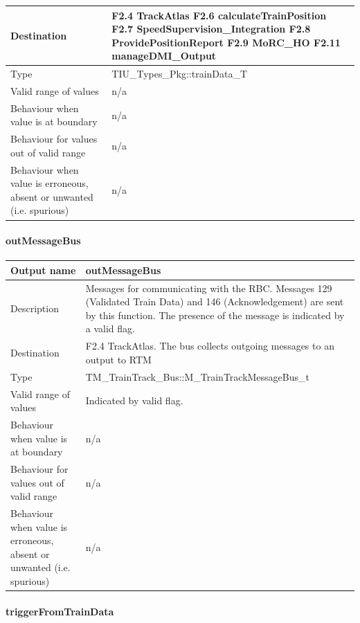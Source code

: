 \begin{longtable}{p{}p{}}
\midrule
Destination				& F2.4 TrackAtlas\newline
F2.6 calculateTrainPosition\newline
F2.7 SpeedSupervision\_Integration\newline
F2.8 ProvidePositionReport\newline
F2.9 MoRC\_HO\newline
F2.11 manageDMI\_Output 
\\ 
\midrule
Type						& TIU\_Types\_Pkg::trainData\_T \\
\midrule
Valid range of values			& n/a \\
\midrule
Behaviour when value is at boundary	& n/a \\
\midrule
Behaviour for values out of valid range	& n/a \\
\midrule
Behaviour when value is erroneous, absent or unwanted (i.e. spurious) &n/a \\
\bottomrule
\end{longtable}

\paragraph{outMessageBus}

\begin{longtable}{p{}p{}}
\toprule
Output name				& outMessageBus\\
\midrule
Description				& Messages for communicating with the RBC. Messages 129 (Validated Train Data) and 146 (Acknowledgement) are sent by this function. The presence of the message is indicated by a valid flag.\\
\midrule
Destination				& F2.4 TrackAtlas. The bus collects outgoing messages to an output to RTM\\ 
\midrule
Type					& TM\_TrainTrack\_Bus::M\_TrainTrackMessageBus\_t\\
\midrule
Valid range of values	& Indicated by valid flag. \\
\midrule
Behaviour when value is at boundary	& n/a\\
\midrule
Behaviour for values out of valid range	& n/a \\
\midrule
Behaviour when value is erroneous, absent or unwanted (i.e. spurious) & n/a\\
\bottomrule
\end{longtable}

\paragraph{triggerFromTrainData}

